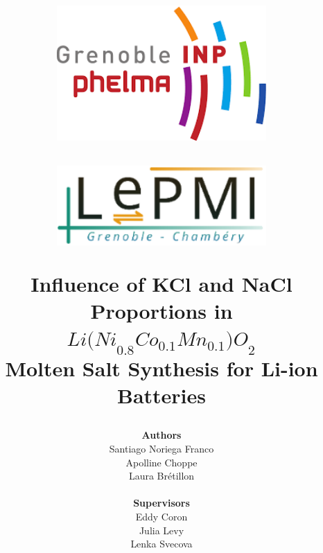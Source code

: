 \documentclass{article}
\begin{document}
\title{
  \vspace{-3cm}  %
  \begin{minipage}{0.48\textwidth}
     \raggedright  %
    \includegraphics[width=0.6\textwidth]{images.png}  %
   \vspace{2cm}
  \end{minipage}
  \begin{minipage}{0.48\textwidth}
    \raggedleft
 
    \includegraphics[width=0.6\textwidth]{lepmi_logo.png}
    \vspace{2cm}
  \end{minipage}
  \vspace{2cm}

  \textbf{\Large Influence of KCl and NaCl Proportions in\\
  ${Li(Ni}_{0.8}{Co}_{0.1}{Mn}_{0.1}{)O}_{2}$ }\\ 
  \vspace{0.3cm}
  \textbf{\Large Molten Salt Synthesis for Li-ion Batteries}
    \vspace{4cm}
  }
 

  \author{
    \textbf{Authors}\\
    Santiago Noriega Franco \\
    Apolline Choppe \\
    Laura Brétillon\\
\\  
  \textbf{Supervisors}\\
  Eddy Coron\\
  Julia Levy\\
  Lenka Svecova}
\end{document}
